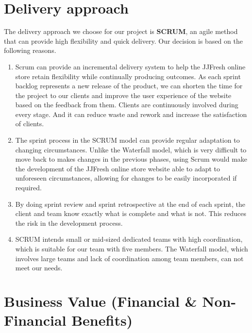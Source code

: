 \documentclass{report}
\begin{document}
\section{Delivery approach}
The delivery approach we choose for our project is \textbf{SCRUM}, an agile method that can provide high flexibility and quick delivery. Our decision is based on the following reasons.
\begin{enumerate}
  \item Scrum can provide an incremental delivery system to help the JJFresh online store retain flexibility while continually producing outcomes. As each sprint backlog represents a new release of the product, we can shorten the time for the project to our clients and improve the user experience of the website based on the feedback from them. Clients are continuously involved during every stage. And it can reduce waste and rework and increase the satisfaction of clients.
  \item The sprint process in the SCRUM model can provide regular adaptation to changing circumstances. Unlike the Waterfall model, which is very difficult to move back to makes changes in the previous phases, using Scrum would make the development of the JJFresh online store website able to adapt to unforeseen circumstances, allowing for changes to be easily incorporated if required.
  \item By doing sprint review and sprint retrospective at the end of each sprint, the client and team know exactly what is complete and what is not. This reduces the risk in the development process.
  \item SCRUM intends small or mid-sized dedicated teams with high coordination, which is suitable for our team with five members. The Waterfall model, which involves large teams and lack of coordination among team members, can not meet our needs.
\end{enumerate}
\section{Business Value (Financial \& Non-Financial Benefits)}
\end{document}
